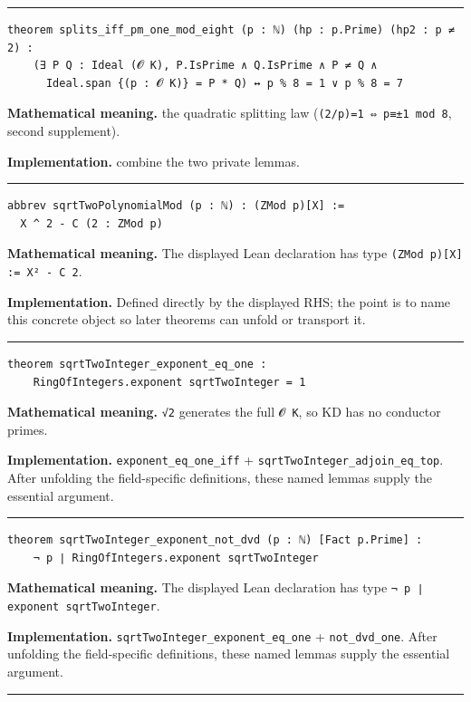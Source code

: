 \documentclass[UTF8,a4paper,11pt,fontset=fandol]{ctexart}
\theoremstyle{definition}
\newcommand{\statementsep}{\par\medskip\hrule\medskip}
\begin{document}
\statementsep
\begin{verbatim}
theorem splits_iff_pm_one_mod_eight (p : ℕ) (hp : p.Prime) (hp2 : p ≠ 2) :
    (∃ P Q : Ideal (𝓞 K), P.IsPrime ∧ Q.IsPrime ∧ P ≠ Q ∧
      Ideal.span {(p : 𝓞 K)} = P * Q) ↔ p % 8 = 1 ∨ p % 8 = 7
\end{verbatim}
\noindent\textbf{Mathematical meaning.} the quadratic splitting law (\texttt{(2/\allowbreak{}p)=1 ⇔ p≡±1 mod 8}, second supplement).\par
\noindent\textbf{Implementation.} combine the two private lemmas.\par
\statementsep
\begin{verbatim}
abbrev sqrtTwoPolynomialMod (p : ℕ) : (ZMod p)[X] :=
  X ^ 2 - C (2 : ZMod p)
\end{verbatim}
\noindent\textbf{Mathematical meaning.} The displayed Lean declaration has type \texttt{(ZMod p)[X] := X² - C 2}.\par
\noindent\textbf{Implementation.} Defined directly by the displayed RHS; the point is to name this concrete object so later theorems can unfold or transport it.\par
\statementsep
\begin{verbatim}
theorem sqrtTwoInteger_exponent_eq_one :
    RingOfIntegers.exponent sqrtTwoInteger = 1
\end{verbatim}
\noindent\textbf{Mathematical meaning.} \texttt{√2} generates the full \texttt{𝓞 K}, so KD has no conductor primes.\par
\noindent\textbf{Implementation.} \texttt{exponent\_\allowbreak{}eq\_\allowbreak{}one\_\allowbreak{}iff} + \texttt{sqrtTwoInteger\_\allowbreak{}adjoin\_\allowbreak{}eq\_\allowbreak{}top}. After unfolding the field-specific definitions, these named lemmas supply the essential argument.\par
\statementsep
\begin{verbatim}
theorem sqrtTwoInteger_exponent_not_dvd (p : ℕ) [Fact p.Prime] :
    ¬ p ∣ RingOfIntegers.exponent sqrtTwoInteger
\end{verbatim}
\noindent\textbf{Mathematical meaning.} The displayed Lean declaration has type \texttt{¬ p ∣ exponent sqrtTwoInteger}.\par
\noindent\textbf{Implementation.} \texttt{sqrtTwoInteger\_\allowbreak{}exponent\_\allowbreak{}eq\_\allowbreak{}one} + \texttt{not\_\allowbreak{}dvd\_\allowbreak{}one}. After unfolding the field-specific definitions, these named lemmas supply the essential argument.\par
\statementsep
\end{document}
